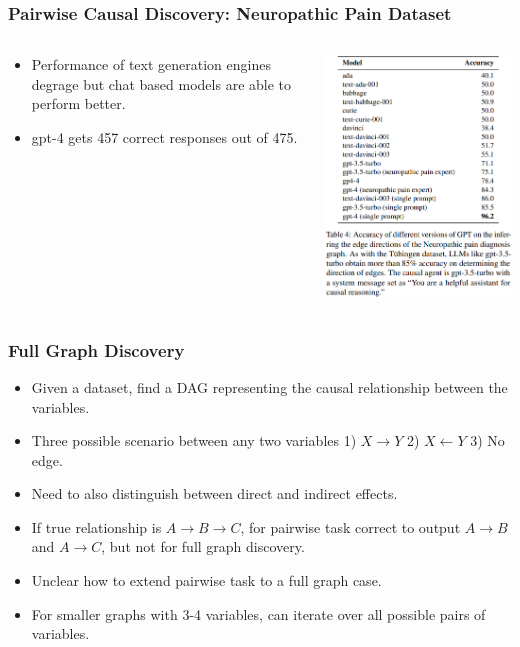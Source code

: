 \documentclass{beamer}
\begin{document}
\begin{frame}
	\frametitle{Pairwise Causal Discovery: Neuropathic Pain Dataset}
	\begin{columns}
		\begin{column}{0.5 \textwidth}
			\begin{itemize}
				\item Performance of text generation engines degrage but chat based models are able to perform better.
				\item gpt-4 gets 457 correct responses out of 475.
			\end{itemize}
		\end{column}
		\begin{column}{0.5 \textwidth}
			\includegraphics[scale=0.4]{imgs/table4.png}
		\end{column}
	\end{columns}
\end{frame}

\begin{frame}
	\frametitle{Full Graph Discovery}
	\begin{itemize}
		\item Given a dataset, find a DAG representing the causal relationship between the variables.
		\item Three possible scenario between any two variables 1) $ X \rightarrow Y $ 2) $ X \leftarrow Y $ 3) No edge.
		\item Need to also distinguish between direct and indirect effects.
		\item If true relationship is $ A \rightarrow B \rightarrow C $, for pairwise task correct to output $ A \rightarrow B $
			and $ A \rightarrow C $, but not for full graph discovery.
		\item Unclear how to extend pairwise task to a full graph case.
		\item For smaller graphs with 3-4 variables, can iterate over all possible pairs of variables.
	\end{itemize}
\end{frame}
\end{document}
